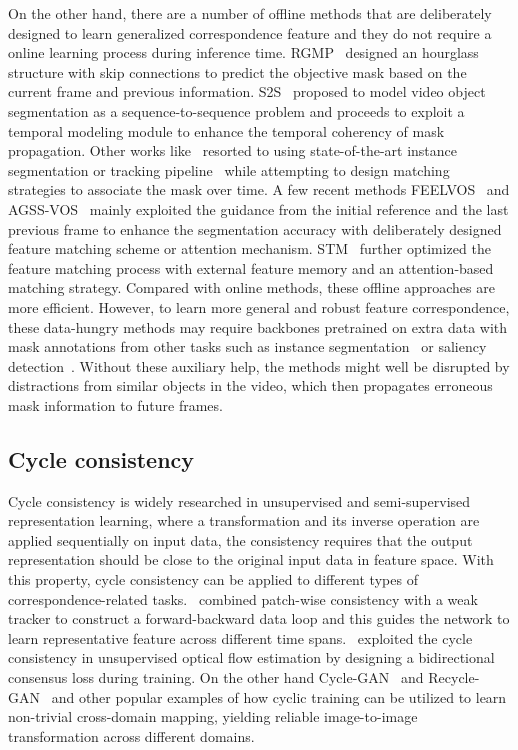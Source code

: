 \documentclass{article}
\begin{document}
On the other hand, there are a number of offline methods that are deliberately designed to learn generalized correspondence feature and they do not require a online learning process during inference time. RGMP~\cite{Oh_2018_CVPR} designed an hourglass structure with skip connections to predict the objective mask based on the current frame and previous information. S2S~\cite{Xu_2018_S2S_ECCV} proposed to model video object segmentation as a sequence-to-sequence problem and proceeds to exploit a temporal modeling module to enhance the temporal coherency of mask propagation. Other works like~\cite{Zeng_2019_ICCV,luiten2018premvos} resorted to using state-of-the-art instance segmentation or tracking pipeline~\cite{He2018Mask,peng2020ctracker} while attempting to design matching strategies to associate the mask over time. A few recent methods FEELVOS~\cite{Voigtlaender_2019_CVPR} and AGSS-VOS~\cite{Lin_2019_ICCV} mainly exploited the guidance from the initial reference and the last previous frame to enhance the segmentation accuracy with deliberately designed feature matching scheme or attention mechanism. STM~\cite{Oh_2019_ICCV} further optimized the feature matching process with external feature memory and an attention-based matching strategy. Compared with online methods, these offline approaches are more efficient. However, to learn more general and robust feature correspondence, these data-hungry methods may require backbones pretrained on extra data with mask annotations from other tasks such as instance segmentation~\cite{COCO} or saliency detection~\cite{CSSD}. Without these auxiliary help, the methods might well be disrupted by distractions from similar objects in the video, which then propagates erroneous mask information to future frames.



\subsection{Cycle consistency}
Cycle consistency is widely researched in unsupervised and semi-supervised representation learning, where a transformation and its inverse operation are applied sequentially on input data, the consistency requires that the output representation should be close to the original input data in feature space. With this property, cycle consistency can be applied to different types of correspondence-related tasks.~\cite{CVPR2019_CycleTime} combined patch-wise consistency with a weak tracker to construct a forward-backward data loop and this guides the network to learn representative feature across different time spans.~\cite{Meister:2018:UUL} exploited the cycle consistency in unsupervised optical flow estimation by designing a bidirectional consensus loss during training. On the other hand Cycle-GAN~\cite{CycleGAN2017} and Recycle-GAN~\cite{Bansal2018Recycle} and other popular examples of how cyclic training can be utilized to learn non-trivial cross-domain mapping, yielding reliable image-to-image transformation across different domains.
\end{document}
